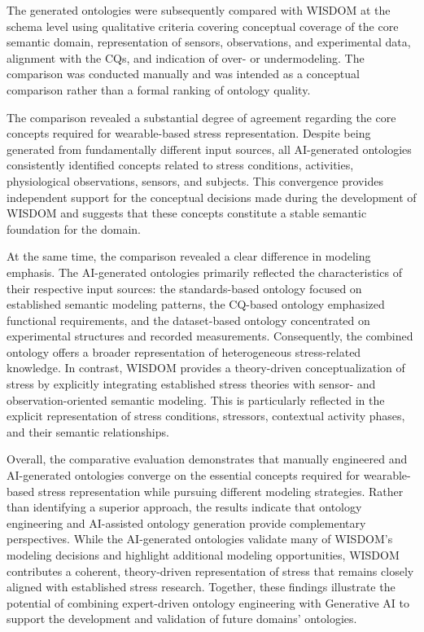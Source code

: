 \documentclass[
]{ceurart}
\begin{document}
The generated ontologies were subsequently compared with WISDOM at the schema level using qualitative criteria covering conceptual coverage of the core semantic domain, representation of sensors, observations, and experimental data, alignment with the CQs, and indication of over- or undermodeling. The comparison was conducted manually and was intended as a conceptual comparison rather than a formal ranking of ontology quality. 

The comparison revealed a substantial degree of agreement regarding the core concepts required for wearable-based stress representation. Despite being generated from fundamentally different input sources, all AI-generated ontologies consistently identified concepts related to stress conditions, activities, physiological observations, sensors, and subjects. This convergence provides independent support for the conceptual decisions made during the development of WISDOM and suggests that these concepts constitute a stable semantic foundation for the domain.

At the same time, the comparison revealed a clear difference in modeling emphasis. The AI-generated ontologies primarily reflected the characteristics of their respective input sources: the standards-based ontology focused on established semantic modeling patterns, the CQ-based ontology emphasized functional requirements, and the dataset-based ontology concentrated on experimental structures and recorded measurements. Consequently, the combined ontology offers a broader representation of heterogeneous stress-related knowledge. In contrast, WISDOM provides a theory-driven conceptualization of stress by explicitly integrating established stress theories with sensor- and observation-oriented semantic modeling. This is particularly reflected in the explicit representation of stress conditions, stressors, contextual activity phases, and their semantic relationships.

Overall, the comparative evaluation demonstrates that manually engineered and AI-generated ontologies converge on the essential concepts required for wearable-based stress representation while pursuing different modeling strategies. Rather than identifying a superior approach, the results indicate that ontology engineering and AI-assisted ontology generation provide complementary perspectives. While the AI-generated ontologies validate many of WISDOM's modeling decisions and highlight additional modeling opportunities, WISDOM contributes a coherent, theory-driven representation of stress that remains closely aligned with established stress research. Together, these findings illustrate the potential of combining expert-driven ontology engineering with Generative AI to support the development and validation of future domains' ontologies.
\end{document}
